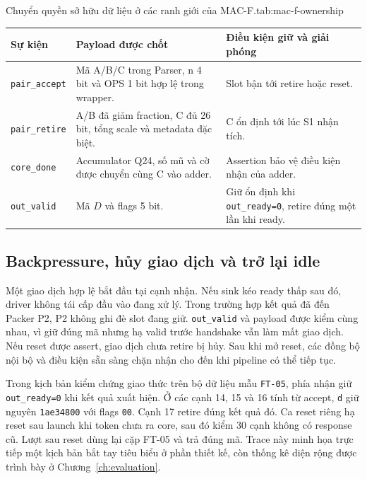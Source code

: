 \begin{engineeringtable}{Chuyển quyền sở hữu dữ liệu ở các ranh giới của MAC-F.}{tab:mac-f-ownership}
\begin{tabularx}{\linewidth}{@{}>{\raggedright\arraybackslash}p{34mm}Y Y@{}}
\toprule
Sự kiện & Payload được chốt & Điều kiện giữ và giải phóng \\
\midrule
\texttt{pair\_accept} & Mã A/B/C trong Parser, n 4 bit và OPS 1 bit hợp lệ trong wrapper. & Slot bận tới retire hoặc reset. \\
\texttt{pair\_retire} & A/B đã giảm fraction, C đủ 26 bit, tổng scale và metadata đặc biệt. & C ổn định tới lúc S1 nhận tích. \\
\texttt{core\_done} & Accumulator Q24, số mũ và cờ được chuyển cùng C vào adder. & Assertion bảo vệ điều kiện nhận của adder. \\
\texttt{out\_valid} & Mã $D$ và flags 5 bit. & Giữ ổn định khi \texttt{out\_ready=0}, retire đúng một lần khi ready. \\
\bottomrule
\end{tabularx}
\end{engineeringtable}

\subsection{Backpressure, hủy giao dịch và trở lại idle}

Một giao dịch hợp lệ bắt đầu tại cạnh nhận. Nếu sink kéo ready thấp
sau đó, driver không tái cấp đầu vào đang xử lý. Trong trường hợp kết
quả đã đến Packer P2, P2 không ghi đè slot đang giữ. \texttt{out\_valid}
và payload được kiểm cùng nhau, vì giữ đúng mã nhưng hạ valid trước
handshake vẫn làm mất giao dịch. Nếu reset được assert, giao dịch
chưa retire bị hủy. Sau khi mở reset, các đồng bộ nội bộ và điều kiện
sẵn sàng chặn nhận cho đến khi pipeline có thể tiếp tục.

Trong kịch bản kiểm chứng giao thức trên bộ dữ liệu mẫu \texttt{FT-05}, phía nhận giữ \texttt{out\_ready=0} khi
kết quả xuất hiện. Ở các cạnh 14, 15 và 16 tính từ accept, \texttt{d} giữ nguyên
\texttt{1ae34800} với flags \texttt{00}. Cạnh 17 retire đúng kết quả
đó. Ca reset riêng hạ reset sau launch khi token chưa ra core,
sau đó kiểm 30 cạnh không có response cũ. Lượt sau reset dùng lại
cặp FT-05 và trả đúng mã. Trace này minh họa trực tiếp một kịch bản bắt tay
tiêu biểu ở phần thiết kế, còn thống kê diện rộng được trình bày ở Chương~\ref{ch:evaluation}.
